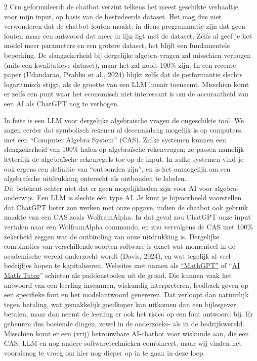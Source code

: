 \begin{multicols} {2}
    Cru geformuleerd: de chatbot verzint telkens het meest geschikte verhaaltje voor mijn input, op basis van de bestudeerde dataset.
    Het mag dus niet verwonderen dat de chatbot fouten maakt: in diens programmatie zijn dat geen fouten maar een antwoord dat meer in lijn ligt met de dataset.
    Zelfs al geef je het model meer parameters en een grotere dataset, het blijft een fundamentele beperking.
    De slaagzekerheid bij dergelijke algebra-vragen zal misschien verhogen (mits een kwalitatieve dataset), maar het zal nooit 100\% zijn.
    In een recente paper (Udandarao, Prabhu et al., 2024) blijkt zelfs dat de performantie slechts logaritmisch stijgt, als de grootte van een LLM lineair toeneemt.
    Misschien komt er zelfs een punt waar het economisch niet interessant is om de accuraatheid van een AI als ChatGPT nog te verhogen.
    
    In feite is een LLM voor dergelijke algebraïsche vragen de ongeschikte tool.
    We zagen eerder dat symbolisch rekenen al decennialang mogelijk is op computers, met een ``Computer Algebra System'' (CAS).
    Zulke systemen kunnen een slaagzekerheid van 100\% halen op algebraïsche rekenvragen; ze passen namelijk letterlijk de algebraïsche rekenregels toe op de input.
    In zulke systemen vind je ook ergens een definitie van ``ontbonden zijn'', en is het onmogelijk om een algebraïsche uitdrukking onterecht als ontbonden te labelen.\\

    Dit betekent echter niet dat er geen mogelijkheden zijn voor AI voor algebra-onderwijs.
    Een LLM is slechts één type AI.
    Je kunt je bijvoorbeeld voorstellen dat ChatGPT beter zou werken met onze opgave, indien de chatbot ook gebruik maakte van een CAS zoals WolframAlpha.
    In dat geval zou ChatGPT onze input vertalen naar een WolframAlpha commando, en zou vervolgens de CAS met 100\% zekerheid zeggen wat de ontbinding van onze uitdrukking is.
    Dergelijke combinaties van verschillende soorten software is exact wat momenteel in de academische wereld onderzocht wordt (Davis, 2024), en wat tegelijk al veel bedrijfjes hopen te kapitaliseren.
    Websites met namen als \href{https://www.google.com/search?q=mathgpt}{``MathGPT''} of ``\href{https://www.google.com/search?q=AI+Math+Tutor}{AI Math Tutor}'' schieten als paddenstoelen uit de grond. 
    Die kunnen vaak het antwoord van een leerling inscannen, wiskundig interpreteren, feedback geven op een specifieke fout en het modelantwoord genereren.
    Dat verloopt dan natuurlijk tegen betaling, wat gemakkelijk goedkoper kan uitkomen dan een bijlesgever betalen, maar dan neemt de leerling er ook het risico op een fout antwoord bij.
    Er gebeuren dus boeiende dingen, zowel in de onderzoeks- als in de bedrijfswereld.
    Misschien komt er een (vrij) betrouwbare AI-chatbot voor wiskunde aan, die een CAS, LLM en nog andere softwaretechnieken combineert, maar wij vinden het vooralsnog te vroeg om hier nog dieper op in te gaan in deze loep.


\end{multicols}
